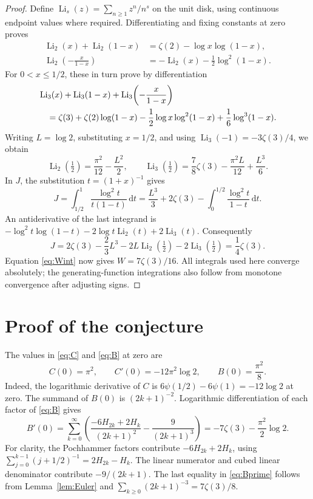 \documentclass[11pt]{article}
\newcommand{\Li}{\operatorname{Li}}
\newcommand{\dd}{\,\mathrm{d}}
\begin{document}
\begin{proof}
Define $\Li_s(z)=\sum_{n\geq1}z^n/n^s$ on the unit disk, using continuous
endpoint values where required. Differentiating and fixing constants
at zero proves
\begin{align}
 \Li_2(x)+\Li_2(1-x)&=\zeta(2)-\log x\log(1-x),\label{eq:dilog1}\\
 \Li_2\!\left(-\frac{x}{1-x}\right)
 &=-\Li_2(x)-\frac12\log^2(1-x).\label{eq:dilog2}
\end{align}
For $0<x\leq1/2$, these in turn prove by differentiation
\begin{align}
 &\Li_3(x)+\Li_3(1-x)+\Li_3\!\left(-\frac{x}{1-x}\right)\notag\\
 &\hspace{1em}=\zeta(3)+\zeta(2)\log(1-x)
 -\frac12\log x\log^2(1-x)+\frac16\log^3(1-x).
 \label{eq:trilog}
\end{align}
Writing $L=\log2$, substituting $x=1/2$, and using
$\Li_3(-1)=-3\zeta(3)/4$, we obtain
\[
 \Li_2(\tfrac12)=\frac{\pi^2}{12}-\frac{L^2}{2},\qquad
 \Li_3(\tfrac12)=\frac78\zeta(3)-\frac{\pi^2L}{12}+\frac{L^3}{6}.
\]
In $J$, the substitution $t=(1+x)^{-1}$ gives
\[
 J=\int_{1/2}^1\frac{\log^2t}{t(1-t)}\dd t
 =\frac{L^3}{3}+2\zeta(3)-\int_0^{1/2}\frac{\log^2t}{1-t}\dd t.
\]
An antiderivative of the last integrand is
$-\log^2t\log(1-t)-2\log t\Li_2(t)+2\Li_3(t)$.
Consequently
\[
 J=2\zeta(3)-\frac23L^3-2L\Li_2(\tfrac12)
 -2\Li_3(\tfrac12)=\frac14\zeta(3).
\]
Equation \eqref{eq:Wint} now gives $W=7\zeta(3)/16$.
All integrals used here converge absolutely; the generating-function
integrations also follow from monotone convergence after adjusting signs.
\end{proof}

\section{Proof of the conjecture}
The values in \eqref{eq:C} and \eqref{eq:B} at zero are
\begin{equation}\label{eq:CB0}
 C(0)=\pi^2,\qquad C'(0)=-12\pi^2\log2,\qquad B(0)=\frac{\pi^2}{8}.
\end{equation}
Indeed, the logarithmic derivative of $C$ is
$6\psi(1/2)-6\psi(1)=-12\log2$ at zero.
The summand of $B(0)$ is $(2k+1)^{-2}$.
Logarithmic differentiation of each factor of \eqref{eq:B} gives
\begin{equation}\label{eq:Bprime}
 B'(0)=\sum_{k=0}^{\infty}
 \left(\frac{-6H_{2k}+2H_k}{(2k+1)^2}
 -\frac9{(2k+1)^3}\right)
 =-7\zeta(3)-\frac{\pi^2}{2}\log2.
\end{equation}
For clarity, the Pochhammer factors contribute $-6H_{2k}+2H_k$,
using $\sum_{j=0}^{k-1}(j+1/2)^{-1}=2H_{2k}-H_k$.
The linear numerator and cubed linear denominator contribute
$-9/(2k+1)$. The last equality in \eqref{eq:Bprime} follows from
Lemma~\ref{lem:Euler} and
$\sum_{k\geq0}(2k+1)^{-3}=7\zeta(3)/8$.
\end{document}
